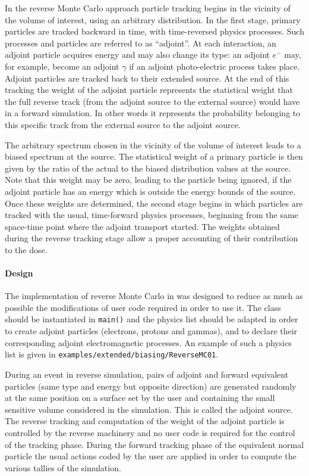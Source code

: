 In the reverse Monte Carlo approach particle tracking begins in the vicinity of
the volume of interest, using an arbitrary distribution.  In the first stage, 
primary particles are tracked backward in time, with time-reversed physics 
processes.  Such processes and particles are referred to as ``adjoint''.  At 
each interaction, an adjoint particle acquires energy and may also change its 
type: an adjoint $e^-$ may, for example, become an adjoint $\gamma$ if an 
adjoint photo-electric process takes place.  Adjoint particles are tracked back
to their extended source.  At the end of this tracking the weight of the adjoint
particle represents the statistical weight that the full reverse track (from the
adjoint source to the external source) would have in a forward simulation.  In 
other words it represents the probability belonging to this specific track from 
the external source to the adjoint source.

The arbitrary spectrum chosen in the vicinity of the volume of interest leads 
to a biased spectrum at the source.  The statistical weight of a primary 
particle is then given by the ratio of the actual to the biased distribution 
values at the source.  Note that this weight may be zero, leading to the 
particle being ignored, if the adjoint particle has an energy which is outside 
the energy bounds of the source.  Once these weights are determined, the second 
stage begins in which particles are tracked with the usual, time-forward physics
processes, beginning from the same space-time point where the adjoint transport 
started.  The weights obtained during the reverse tracking stage allow a proper
accounting of their contribution to the dose.

\paragraph{Design}
The implementation of reverse Monte Carlo in \Gfour{} \cite{bib:revMC} was 
designed to reduce as much as possible the modifications of user code required
in order to use it.  The 
 class should be 
instantiated in \texttt{main()} and the physics list should be adapted in order
to create adjoint particles (electrons, protons and gammas), and to declare 
their corresponding adjoint electromagnetic processes.  An example of such a 
physics list is given in \verb"examples/extended/biasing/ReverseMC01".

During an event in reverse simulation, pairs of adjoint and forward equivalent 
particles (same type and energy but opposite direction) are generated randomly
at the same position on a surface set by the user and containing the small 
sensitive volume considered in the simulation.  This is called the adjoint 
source.  The reverse tracking and computation of the weight of the adjoint 
particle is controlled by the reverse machinery and no user code is required
for the control of the tracking phase.  During the forward tracking phase of 
the equivalent normal particle the usual \Gfour{} actions coded by the user are 
applied in order to compute the various tallies of the simulation. 

